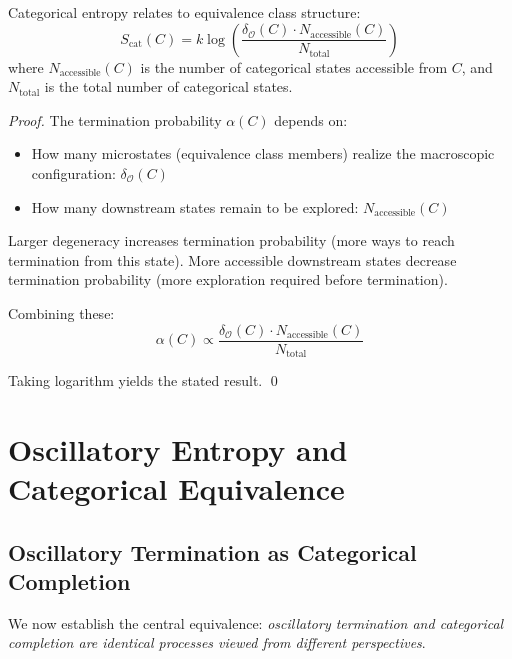 \begin{proposition}
\label{prop:entropy_degeneracy}
Categorical entropy relates to equivalence class structure:
\begin{equation}
S_{\text{cat}}(C) = k \log \left( \frac{\delta_{\mathcal{O}}(C) \cdot N_{\text{accessible}}(C)}{N_{\text{total}}} \right)
\end{equation}
where $N_{\text{accessible}}(C)$ is the number of categorical states accessible from $C$, and $N_{\text{total}}$ is the total number of categorical states.
\end{proposition}

\begin{proof}
The termination probability $\alpha(C)$ depends on:
\begin{itemize}
\item How many microstates (equivalence class members) realize the macroscopic configuration: $\delta_{\mathcal{O}}(C)$
\item How many downstream states remain to be explored: $N_{\text{accessible}}(C)$
\end{itemize}

Larger degeneracy increases termination probability (more ways to reach termination from this state). More accessible downstream states decrease termination probability (more exploration required before termination).

Combining these:
\begin{equation}
\alpha(C) \propto \frac{\delta_{\mathcal{O}}(C) \cdot N_{\text{accessible}}(C)}{N_{\text{total}}}
\end{equation}

Taking logarithm yields the stated result. \qed
\end{proof}

\section{Oscillatory Entropy and Categorical Equivalence}

\subsection{Oscillatory Termination as Categorical Completion}

We now establish the central equivalence: \textit{oscillatory termination and categorical completion are identical processes viewed from different perspectives}.

